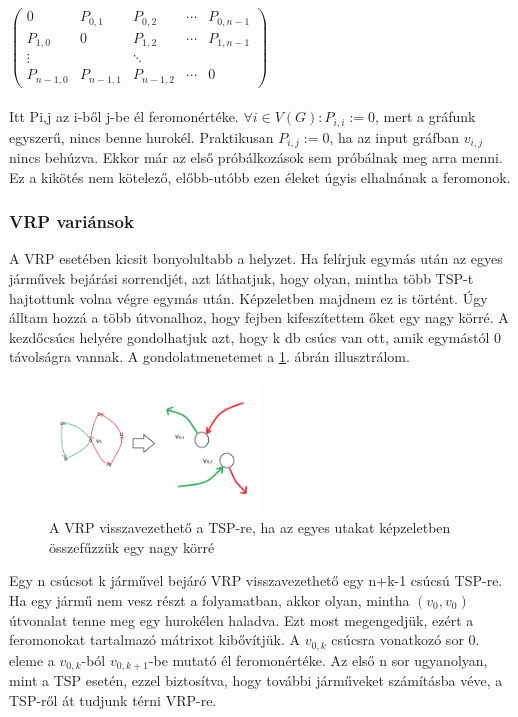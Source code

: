 $\begin{pmatrix}
	0 & P_{0,1} & P_{0,2} & \cdots & P_{0,n-1}\\ 
	P_{1,0} & 0 & P_{1,2} & \cdots & P_{1,n-1} \\
	\vdots & & \ddots \\
	P_{n-1,0} & P_{n-1,1} & P_{n-1,2} & \cdots & 0
\end{pmatrix}$

\paragraph{}

Itt P{\scriptsize i,j} az i-ből j-be él feromonértéke. \( \forall i\in V(G) : P_{i,i}:=0 \), mert a gráfunk egyszerű, nincs benne hurokél. Praktikusan \( P_{i,j}:=0 \), ha az input gráfban \(v_{i,j}\) nincs behúzva. Ekkor már az első próbálkozások sem próbálnak meg arra menni. Ez a kikötés nem kötelező, előbb-utóbb ezen éleket úgyis elhalnának a feromonok. 

\subsubsection{VRP variánsok} \label{VRPvariants_subsection}
A VRP esetében kicsit bonyolultabb a helyzet. Ha felírjuk egymás után az egyes járművek bejárási sorrendjét, azt láthatjuk, hogy olyan, mintha több TSP-t hajtottunk volna végre egymás után. Képzeletben majdnem ez is történt. Úgy álltam hozzá a több útvonalhoz, hogy fejben kifeszítettem őket egy nagy körré. A kezdőcsúcs helyére gondolhatjuk azt, hogy k db csúcs van ott, amik egymástól 0 távolságra vannak. A gondolatmenetemet a \ref{tsp-to-vrp}. ábrán illusztrálom. 

\begin{figure}[ht!]
	\centering
	\includegraphics[width=0.5\textwidth]{figures/tsp-to-vrp.png}
	\caption{A VRP visszavezethető a TSP-re, ha az egyes utakat képzeletben összefűzzük egy nagy körré \label{tsp-to-vrp} }
\end{figure}

Egy n csúcsot k járművel bejáró VRP visszavezethető egy n+k-1 csúcsú TSP-re. Ha egy jármű nem vesz részt a folyamatban, akkor olyan, mintha \( (v_0,v_0) \) útvonalat tenne meg egy hurokélen haladva. Ezt most megengedjük, ezért a feromonokat tartalmazó mátrixot kibővítjük. A \(v_{0,k} \) csúcsra vonatkozó sor 0. eleme a \( v_{0,k}\)-ból \(v_{0,k+1}\)-be mutató él feromonértéke. Az első n sor ugyanolyan, mint a TSP esetén, ezzel biztosítva, hogy további járműveket számításba véve, a TSP-ről át tudjunk térni VRP-re.

